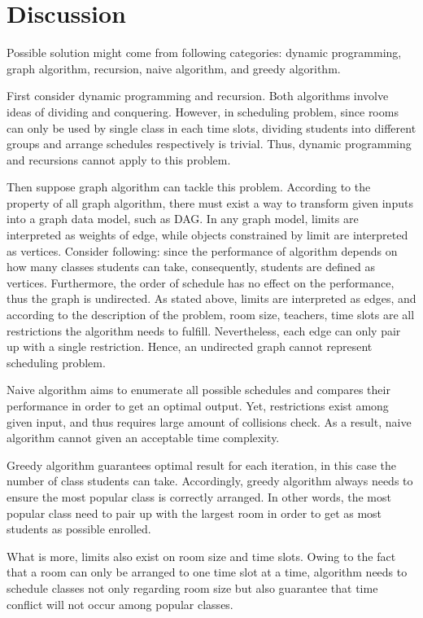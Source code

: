 \documentclass[11pt, oneside]{article}   	%
\begin{document}
\section{Discussion}
Possible solution might come from following categories:  dynamic programming, graph algorithm, recursion, naive algorithm, and greedy algorithm. 
\par First consider dynamic programming and recursion. Both algorithms involve ideas of dividing and conquering. However, in scheduling problem, since rooms can only be used by single class in each time slots, dividing students into different groups and arrange schedules respectively is trivial. Thus, dynamic programming and recursions cannot apply to this problem.\par
Then suppose graph algorithm can tackle this problem. According to the property of all graph algorithm, there must exist a way to transform given inputs into a graph data model, such as DAG. In any graph model, limits are interpreted as weights of edge, while objects constrained by limit are interpreted as vertices. Consider following: since the performance of algorithm depends on how many classes students can take, consequently, students are defined as vertices. Furthermore, the order of schedule has no effect on the performance, thus the graph is undirected. As stated above, limits are interpreted as edges, and according to the description of the problem, room size, teachers, time slots are all restrictions the algorithm needs to fulfill. Nevertheless, each edge can only pair up with a single restriction. Hence, an undirected graph cannot represent scheduling problem.\par
Naive algorithm aims to enumerate all possible schedules and compares their performance in order to get an optimal output. Yet, restrictions exist among given input, and thus requires large amount of collisions check. As a result, naive algorithm cannot given an acceptable time complexity.\par
Greedy algorithm guarantees optimal result for each iteration, in this case the number of class students can take. Accordingly, greedy algorithm always needs to ensure the most popular class is correctly arranged. In other words, the most popular class need to pair up with the largest room in order to get as most students as possible enrolled.
\par What is more, limits also exist on room size and time slots. Owing to the fact that a room can only be arranged to one time slot at a time, algorithm needs to schedule classes not only regarding room size but also guarantee that time conflict will not occur among popular classes.
\end{document}
